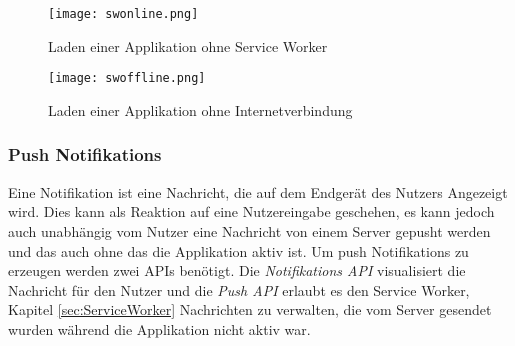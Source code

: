 \begin{figure}
    \centering
    \texttt{[image: swonline.png]}
    \caption{Laden einer Applikation ohne Service Worker}
    \label{img:swonline}
\end{figure}

\begin{figure}
    \centering
    \texttt{[image: swoffline.png]}
    \caption{Laden einer Applikation ohne Internetverbindung}
    \label{img:swoffline}
\end{figure}


\subsubsection{Push Notifikations}

Eine Notifikation ist eine Nachricht, die auf dem Endgerät des Nutzers Angezeigt wird. Dies kann als Reaktion auf eine Nutzereingabe geschehen, es kann jedoch auch unabhängig vom Nutzer eine Nachricht von einem Server \glqq gepusht\grqq{} werden und das auch ohne das die Applikation aktiv ist.  Um push Notifikations zu erzeugen werden zwei APIs benötigt. Die \textit{Notifikations API} visualisiert die Nachricht für den Nutzer und die \textit{Push API} erlaubt es den Service Worker, Kapitel \ref{sec:ServiceWorker} Nachrichten zu verwalten, die vom Server gesendet wurden während die Applikation nicht aktiv war. 
